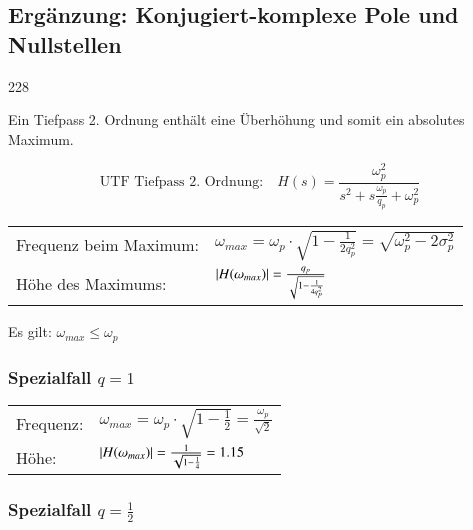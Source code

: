 \subsection{Ergänzung: Konjugiert-komplexe Pole und Nullstellen}{228}   %

Ein Tiefpass 2. Ordnung enthält eine Überhöhung und somit ein absolutes Maximum. 

$$ \text{UTF Tiefpass 2. Ordnung:} \quad H(s) = \frac{\omega_p^2}{s^2 + s \frac{\omega_p}{q_p} + \omega_p^2} $$

\renewcommand{\arraystretch}{2}
\begin{tabular}{ll}
    Frequenz beim Maximum:  & $ \omega_{max} = \omega_p \cdot \sqrt{1 - \frac{1}{2 q_p^2}} = \sqrt{\omega_p^2 - 2 \sigma_p^2}$ \\
    Höhe des Maximums:      & $ \left|H(\omega_{max})\right| = \frac{q_p}{\sqrt{1 - \frac{1}{4 q_p^2}}}$ \\
\end{tabular}

\textrightarrow Es gilt: $\omega_{max} \leq \omega_p$


\subsubsection{Spezialfall $q = 1$}

\renewcommand{\arraystretch}{1.5}
\begin{minipage}[t]{0.55\columnwidth}    
    \begin{tabular}{ll}
        Frequenz:  & $ \omega_{max} = \omega_p \cdot \sqrt{1 - \frac{1}{2}} = \frac{\omega_p}{\sqrt{2}}$ \\
        Höhe:      & $ \left|H(\omega_{max})\right| = \frac{1}{\sqrt{1 - \frac{1}{4}}} = 1.15$ \\
    \end{tabular}

\end{minipage}
\hfill
\begin{minipage}[t]{0.43\columnwidth}

\end{minipage}


\subsubsection{Spezialfall $q = \frac{1}{2}$}

